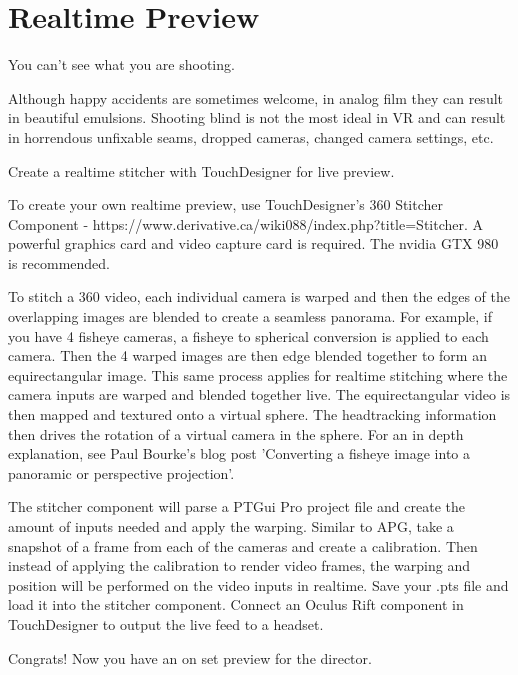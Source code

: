 \chapter{Realtime Preview}
\pagecolor{white}
\label{chap:11}
\begin{fullwidth}

\problem

{\large You can’t see what you are shooting.  \par}


Although happy accidents are sometimes welcome, in analog film they can result in beautiful emulsions.  Shooting blind is not the most ideal in VR and can result in horrendous unfixable seams, dropped cameras, changed camera settings, etc. 


\solution

{\large Create a realtime stitcher with TouchDesigner for live preview. 
 \par}

To create your own realtime preview, use TouchDesigner’s 360 Stitcher Component - https://www.derivative.ca/wiki088/index.php?title=Stitcher. A powerful graphics card and video capture card is required. The nvidia GTX 980 is recommended. 

To stitch a 360 video, each individual camera is warped and then the edges of the overlapping images are blended to create a seamless panorama. For example, if you have 4 fisheye cameras, a fisheye to spherical conversion is applied to each camera. Then the 4 warped images are then edge blended together to form an equirectangular image. This same process applies for realtime stitching where the camera inputs are warped and blended together live. The equirectangular video is then mapped and textured onto a virtual sphere. The headtracking information then drives the rotation of a virtual camera in the sphere. For an in depth explanation, see Paul Bourke's blog post 'Converting a fisheye image
into a panoramic or perspective projection'.

The stitcher component will parse a PTGui Pro project file and create the amount of inputs needed and apply the warping. Similar to APG, take a snapshot of a frame from each of the cameras and create a calibration. Then instead of applying the calibration to render video frames, the warping and position will be performed on the video inputs in realtime. Save your .pts file and load it into the stitcher component. Connect an Oculus Rift component in TouchDesigner to output the live feed to a headset.

Congrats! Now you have an on set preview for the director.



\clearpage
\end{fullwidth}
